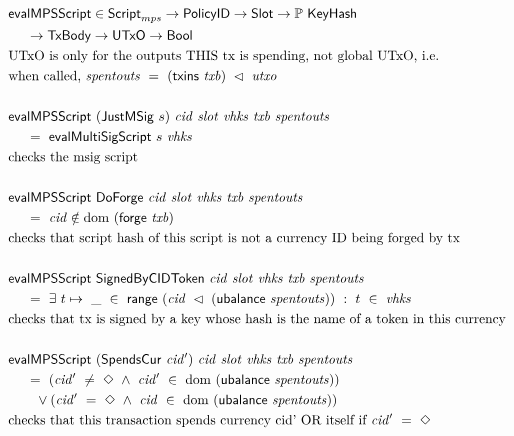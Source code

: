 \begin{figure*}[htb]
  \begin{align*}
    & \fun{evalMPSScript} \in\ScriptMPS\to\PolicyID\to\Slot\to\powerset\KeyHash \\
    &~~~~\to\TxBody\to\UTxO \to\Bool  \\
    & \text{UTxO is only for the outputs THIS tx is spending, not global UTxO, i.e.} \\
    & \text{when called,}~\var{spentouts}~=~(\fun{txins}~\var{txb}) ~\restrictdom~\var{utxo} \\~\\
    & \fun{evalMPSScript}  ~(\type{JustMSig}~s)~\var{cid}~\var{slot}~\var{vhks}
     ~\var{txb}~\var{spentouts} \\
    &~~~~ =~ \fun{evalMultiSigScript}~s~\var{vhks} \\
    & \text {checks the msig script}\\~\\
    & \fun{evalMPSScript}
     ~\type{DoForge}~\var{cid}~ \var{slot}~\var{vhks} ~\var{txb}~\var{spentouts} \\
    &~~~~ =~ \var{cid} \notin \dom~(\fun{forge}~\var{txb}) \\
    & \text {checks that script hash of this script is not a currency ID being forged by tx}  \\~\\
    & \fun{evalMPSScript}
     ~\type{SignedByCIDToken}~\var{cid}~ \var{slot}~\var{vhks} ~\var{txb}~\var{spentouts} \\
    &~~~~ =~ \exists~t\mapsto ~\_~\in~ \fun{range}~(\var{cid}~ \restrictdom~(\fun{ubalance}~\var{spentouts})) ~:~ t~\in~\var{vhks} \\
    & \text{checks that tx is signed by a key whose hash is the name of a token in this currency}
    \\~\\
    & \fun{evalMPSScript}
     ~(\type{SpendsCur}~\var{cid'})~\var{cid}~ \var{slot}~\var{vhks} ~\var{txb}~\var{spentouts} \\
    &~~~~ =~ (\var{cid'}~\neq~\Nothing ~\wedge ~\var{cid'}~\in~ \dom~(\fun{ubalance}~\var{spentouts}))\\
    &~~~~~~ \vee (\var{cid'}~=~\Nothing ~\wedge ~\var{cid}~\in~ \dom~(\fun{ubalance}~\var{spentouts})) \\
    & \text{checks that this transaction spends currency cid' OR itself if}~\var{cid'}~=~\Nothing
    \\~\\

\end{align*}
\end{figure*}
